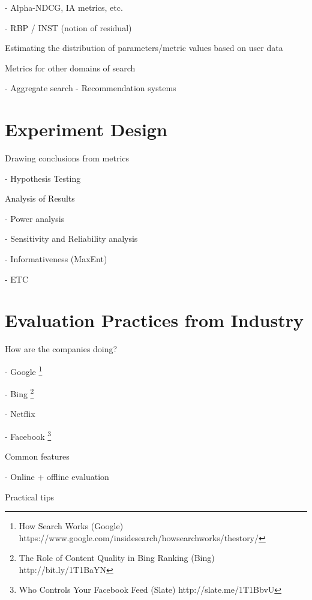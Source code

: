 \documentclass[openany]{now} %
\newcommand{\newpar}{\bigskip\noindent}
\begin{document}
-	Alpha-NDCG, IA metrics, etc.

-	RBP / INST (notion of residual)

\newpar
Estimating the distribution of parameters/metric values based on user data

\newpar
Metrics for other domains of search

- Aggregate search \cite{Zhou:2013}
- Recommendation systems \cite{gunawardana2015evaluating}

\chapter{Experiment Design}
Drawing conclusions from metrics

- Hypothesis Testing \cite{Dincer:2014}

\newpar
Analysis of Results

- Power analysis \cite{Sakai:2014}

- Sensitivity and Reliability analysis \cite{Urbano:2013} 

- Informativeness (MaxEnt)

- ETC \cite{Bron:2013} \cite{Boytsov:2013}  \cite{Robertson:2012}



\chapter{Evaluation Practices from Industry}

How are the companies doing?

-	Google \footnote{How Search Works (Google) https://www.google.com/insidesearch/howsearchworks/thestory/}

-	Bing \footnote{The Role of Content Quality in Bing Ranking (Bing)
	 http://bit.ly/1T1BaYN}

-	Netflix \cite{Gomez-Uribe2015}

-	Facebook \footnote{Who Controls Your Facebook Feed (Slate) http://slate.me/1T1BbvU}

\newpar
Common features

- Online + offline evaluation

\newpar
Practical tips


\backmatter  %



	
\end{document}
